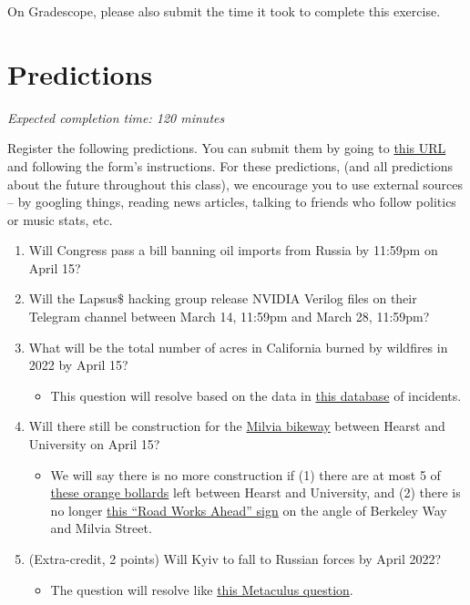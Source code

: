 \documentclass[11pt]{article}
\begin{document}
On Gradescope, please also submit the time it took to complete this exercise.


\section*{Predictions}

\emph{Expected completion time: 120 minutes}

Register the following predictions. You can submit them by going to \href{https://docs.google.com/forms/d/e/1FAIpQLSceQC49WmqDIG0Y9E-O7aTNcfS-hGP_HMg5Qem4W1F5-pt8QQ/viewform?usp=sf_link}{this URL} and following the form's instructions. For these predictions, (and all predictions about the future throughout this class), we encourage you to use external sources -- by googling things, reading news articles, talking to friends who follow politics or music stats, etc.

\begin{enumerate}
	\item Will Congress pass a bill banning oil imports from Russia by 11:59pm on April 15?
	\item Will the Lapsus$\$$ hacking group release NVIDIA Verilog files on their Telegram channel between March 14, 11:59pm and March 28, 11:59pm?
	\item What will be the total number of acres in California burned by wildfires in 2022 by April 15?
	\begin{itemize}
		\item This question will resolve based on the data in \href{https://www.fire.ca.gov/incidents/2022/}{this database} of incidents.
	\end{itemize}
	\item Will there still be construction for the \href{https://www.berkeleyside.org/2021/07/07/milvia-street-berkeley-construction-bike-lanes}{Milvia bikeway} between Hearst and University on April 15?
	\begin{itemize}
		\item We will say there is no more construction if (1) there are at most 5 of \href{https://drive.google.com/file/d/1lnhlF9xAOJ5u1CbSyMmXPxyTUJtdXxue/view?usp=sharing}{these orange bollards} left between Hearst and University, and (2) there is no longer \href{https://drive.google.com/file/d/12rqYnh4DPwEApKft4acDz9lzGxiLPkzr/view?usp=sharing}{this ``Road Works Ahead'' sign} on the angle of Berkeley Way and Milvia Street.
	\end{itemize}
	\item (Extra-credit, 2 points) Will Kyiv to fall to Russian forces by April 2022?
	\begin{itemize}
		\item The question will resolve like \href{https://www.metaculus.com/questions/9939/kyiv-to-fall-to-russian-forces-by-april-2022/}{this Metaculus question}.
	\end{itemize}
\end{enumerate}
\end{document}
